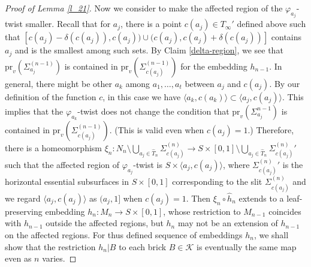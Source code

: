 \documentclass{amsart}
\theoremstyle{definition}
\numberwithin{figure}{section}
\numberwithin{equation}{section}
\newcommand{\pr}{\mathrm{pr}}
\def\ck{\mathcal{K}}
\def\Sg{\Sigma}
\def\Sg{\Sigma}
\begin{document}
\begin{proof}[Proof of Lemma \ref{l_21}]
Now we consider to make the affected region of the $\varphi_{a_j}$-twist smaller.
Recall that for $a_j$, there is a point $c(a_j) \in T_\infty'$ defined above such that $[c(a_j)-\delta(c(a_j)),c(a_j)) \cup (c(a_j), c(a_j)+\delta(c(a_j))]$ contains $a_j$ and  is the smallest among such sets.
By Claim \ref{delta-region}, we see that $\pr_v(\Sg_{a_j}^{(n-1)})$  is contained in $\pr_v(\Sg_{c(a_j)}^{(n-1)})$ for the embedding $h_{n-1}$.
In general, there might be other $a_k$ among $a_1, \dots, a_t$ between $a_j$ and $c(a_j)$.
By our definition of the function $c$, in this case we have $\langle a_k, c(a_k)\rangle \subset \langle a_j, c(a_j)\rangle$.
This implies that the $\varphi_{a_k}$-twist does not change the condition that $\pr_v(\Sg_{a_j}^{n-1})$  is contained in $\pr_v(\Sg_{c(a_j)}^{(n-1)})$.
(This is valid even when $c(a_j)=1$.)
Therefore, there is a homeomorphism $\xi_n:N_n\setminus \bigcup_{a_j \in \hat T_n} \Sg_{c(a_j)}^{(n)}\rightarrow S\times [0,1]\setminus \bigcup_{a_j \in \hat T_n} {\Sg_{c(a_j)}^{(n)}}'$ such that the affected region of $\varphi_{a_j}$-twist is $S \times \langle a_j, c(a_j)\rangle$, 
where ${\Sg_{c(a_j)}^{(n)}}'$ is the  horizontal essential subsurfaces in $S\times [0,1]$ corresponding to the slit $\Sg_{c(a_j)}^{(n)}$ and we regard $\langle a_j, c(a_j)\rangle$ as $(a_j, 1]$ when $c(a_j)=1$.
Then $\xi_n\circ \hat h_n$ extends to a leaf-preserving embedding $h_n :M_n\rightarrow S\times [0,1]$, whose restriction to $M_{n-1}$ coincides with $h_{n-1}$ outside the affected regions,
but $h_n$ may not be an extension of $h_{n-1}$ on the affected regions.
For thus defined sequence of embeddings $h_n$,  we shall show  that the restriction $h_n|B$ to each brick $B \in \ck$ is eventually  the same map even as $n$ varies.



\end{proof}
\end{document}
